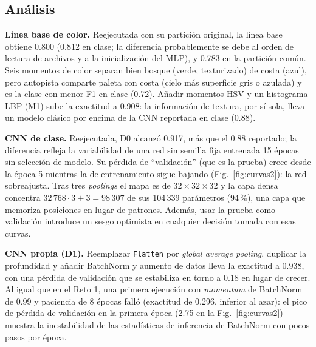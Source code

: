 \documentclass[conference]{IEEEtran}
\begin{document}
\subsection{Análisis}
\textbf{Línea base de color.} Reejecutada con su partición original, la línea base obtiene 0.800 (0.812 en clase; la diferencia probablemente se debe al orden de lectura de archivos y a la inicialización del MLP), y 0.783 en la partición común. Seis momentos de color separan bien bosque (verde, texturizado) de costa (azul), pero autopista comparte paleta con costa (cielo más superficie gris o azulada) y es la clase con menor F1 en clase (0.72). Añadir momentos HSV y un histograma LBP (M1) sube la exactitud a 0.908: la información de textura, por sí sola, lleva un modelo clásico por encima de la CNN reportada en clase (0.88).

\textbf{CNN de clase.} Reejecutada, D0 alcanzó 0.917, más que el 0.88 reportado; la diferencia refleja la variabilidad de una red sin semilla fija entrenada 15 épocas sin selección de modelo. Su pérdida de ``validación'' (que es la prueba) crece desde la época 5 mientras la de entrenamiento sigue bajando (Fig.~\ref{fig:curvas2}): la red sobreajusta. Tras tres \emph{poolings} el mapa es de $32\times32\times32$ y la capa densa concentra $32\,768\cdot3+3=98\,307$ de sus 104\,339 parámetros (94\,\%), una capa que memoriza posiciones en lugar de patrones. Además, usar la prueba como validación introduce un sesgo optimista en cualquier decisión tomada con esas curvas.

\textbf{CNN propia (D1).} Reemplazar \texttt{Flatten} por \emph{global average pooling}, duplicar la profundidad y añadir BatchNorm y aumento de datos lleva la exactitud a 0.938, con una pérdida de validación que se estabiliza en torno a 0.18 en lugar de crecer. Al igual que en el Reto 1, una primera ejecución con \emph{momentum} de BatchNorm de 0.99 y paciencia de 8 épocas falló (exactitud de 0.296, inferior al azar): el pico de pérdida de validación en la primera época (2.75 en la Fig.~\ref{fig:curvas2}) muestra la inestabilidad de las estadísticas de inferencia de BatchNorm con pocos pasos por época.
\end{document}
